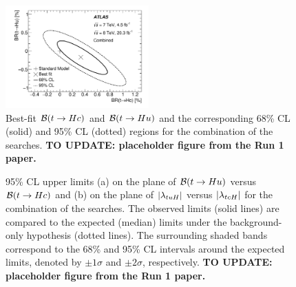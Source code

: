 \begin{figure}[htbp]
\begin{center}
\includegraphics[width=0.49\textwidth]{figures/Combo/fig13.pdf}
\caption{\small {
Best-fit $\mathcal{B}(t\to Hc)$ and $\mathcal{B}(t\to Hu)$ and the corresponding 68\% CL (solid) and 95\% CL (dotted) regions for the combination of the searches.
\textbf{TO UPDATE: placeholder figure from the Run 1 paper.}}}
\label{fig:nllscan_combo_2D} 
\end{center}
\end{figure}

\begin{figure}[htbp]
\begin{center}
\caption{\small {95\% CL upper limits (a) on the plane of $\mathcal{B}(t\to Hu)$ versus $\mathcal{B}(t\to Hc)$ and (b) on the plane 
of $|\lambda_{tuH}|$ versus $|\lambda_{tcH}|$ for the combination of the searches. The observed limits (solid lines) are compared to the expected (median) limits under the background-only hypothesis (dotted lines). The surrounding shaded bands correspond to the 68\% and 95\% CL intervals around the expected limits, 
denoted by $\pm 1\sigma$ and $\pm 2\sigma$, respectively.
\textbf{TO UPDATE: placeholder figure from the Run 1 paper.}}}
\label{fig:limits_combo_2D} 
\end{center}
\end{figure}

